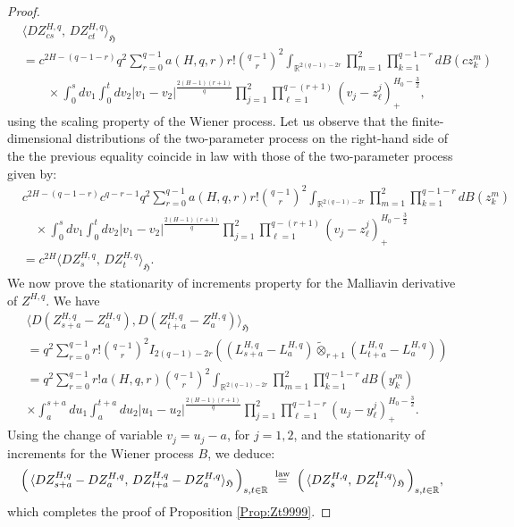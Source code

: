 \documentclass[a4paper,10pt]{article}
\theoremstyle{definition}
\theoremstyle{plain}
\newcommand{\R}{\mathbb{R}}
\newcommand\HHH{\mathfrak{H}}
\newcommand\1{\mathbbm{1}}
\begin{document}
\begin{proof}
\begin{align*}
	&\langle DZ^{H,q}_{cs},\, DZ^{H,q}_{ct}\rangle_{\HHH}\\
	&=c^{2H-(q-1-r)}q^{2} \sum_{r=0} ^{q-1} a(H,q,r) r!  \binom{q-1}{r}^2 \int_{\R ^{2(q-1)-2r}} \prod_{m=1}^{2}\prod_{k=1}^{q-1-r}dB(cz^m_{k})\\
	&\qquad\times \int_{0}^{s}dv_1 \int_{0} ^{t} dv_2 \vert v_1-v_2\vert ^{\frac{2(H-1)(r+1)}{q}}\prod_{j=1}^{2}\prod_{\ell=1}^{q-(r+1)}(v_j-z^j_{\ell})_{+} ^{H_0-\tfrac32},
\end{align*}
using the scaling property of the Wiener process. Let us observe that the finite-dimensional distributions of the two-parameter process on the right-hand side of the the previous equality coincide in law with those of the two-parameter process given by:
\begin{align*}
	&c^{2H-(q-1-r)} c^{q-r-1} q^{2} \sum_{r=0} ^{q-1} a(H,q,r) r!  \binom{q-1}{r}^2 \int_{\R ^{2(q-1)-2r}} \prod_{m=1}^{2}\prod_{k=1}^{q-1-r}dB(z^m_{k}) \\
	&\quad\times\int_{0}^{s}dv_1 \int_{0} ^{t} dv_2 \vert v_1-v_2\vert ^{\frac{2(H-1)(r+1)}{q}}\prod_{j=1}^{2}\prod_{\ell=1}^{q-(r+1)}(v_j-z^j_{\ell})_{+} ^{H_0-\tfrac32}\\
	&=c^{2H}\langle DZ^{H,q}_{s},\, DZ^{H,q}_{t}\rangle_{\HHH}.
\end{align*} 
\indent We now prove the stationarity of increments property for the Malliavin derivative of $Z^{H,q}$. We have
\begin{align*}
	&\langle D(Z^{H,q}_{s+a}-Z^{H,q}_{a}),D(Z^{H,q}_{t+a}-Z^{H,q}_{a}) \rangle _{\HHH}\\
	&=  q^{2}  \sum_{r=0}^{q-1} r! \binom{q-1}{r}^2 I _{2(q-1)-2r}\left( (L^{H,q}_{s+a}-L ^{H,q}_{a})\widetilde{\otimes}_{r+1} (L_{t+a} ^{H,q}- L ^{H,q}_{a})\right)\\
	&=q^{2}\sum_{r=0} ^{q-1} r! a(H,q,r) \binom{q-1}{r}^2  \int_{\R ^{2(q-1)-2r}} \prod_{m=1}^{2}\prod_{k=1}^{q-1-r}dB(y^m_{k})\\
	&\times \int_{a}^{s+a}du_1 \int_{a} ^{t+a} du_2 \vert u_1-u_2\vert ^{\frac{2(H-1)(r+1)}{q}}\prod_{j=1}^{2}\prod_{\ell=1}^{q-1-r}(u_j-y^j_{\ell})_{+} ^{H_0-\tfrac32}.
\end{align*}
Using the change of variable $v_j=u_j-a$, for $j=1,2$,  and the stationarity of increments for the Wiener process $B$, we deduce: 
\[
\Big(\,\langle DZ^{H,q}_{s+a}-DZ^{H,q}_{a},\, DZ^{H,q}_{t+a}-DZ^{H,q}_{a}\rangle_{\HHH}\,\Big)_{s,t\in\R}
\;\overset{\rm law}{=}\;
\Big(\,\langle DZ^{H,q}_{s},\, DZ^{H,q}_{t}\rangle_{\HHH}\,\Big)_{s,t\in\R},
\]
which completes the proof of Proposition \ref{Prop:Zt9999}.
\end{proof}
\end{document}
